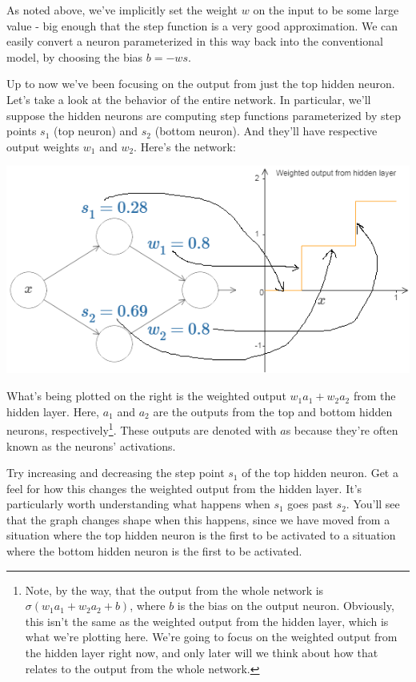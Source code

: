 As noted above, we've implicitly set the weight $w$ on the input to be some large value - big enough that the step function is a very good approximation. We can easily convert a neuron parameterized in this way back into the conventional model, by choosing the bias $b=-ws$.


Up to now we've been focusing on the output from just the top hidden neuron. Let's take a look at the behavior of the entire network. In particular, we'll suppose the hidden neurons are computing step functions parameterized by step points $s_1$ (top neuron) and $s_2$ (bottom neuron). And they'll have respective output weights $w_1$ and $w_2$. Here's the network:

{\centering \includegraphics[width=\textwidth,]{pic/wigglyfn11.png} \par}

What's being plotted on the right is the weighted output $w_1a_1+w_2a_2$ from the hidden layer. Here, $a_1$ and $a_2$ are the outputs from the top and bottom hidden neurons, respectively\footnote{Note, by the way, that the output from the whole network is $\sigma(w_1a_1+w_2a_2+b)$, where $b$ is the bias on the output neuron. Obviously, this isn't the same as the weighted output from the hidden layer, which is what we're plotting here. We're going to focus on the weighted output from the hidden layer right now, and only later will we think about how that relates to the output from the whole network.}. These outputs are denoted with $a$s because they're often known as the neurons' activations.

Try increasing and decreasing the step point $s_1$ of the top hidden neuron. Get a feel for how this changes the weighted output from the hidden layer. It's particularly worth understanding what happens when $s_1$ goes past $s_2$.  You'll see that the graph changes shape when this happens, since we have moved from a situation where the top hidden neuron is the first to be activated to a situation where the bottom hidden neuron is the first to be activated.

